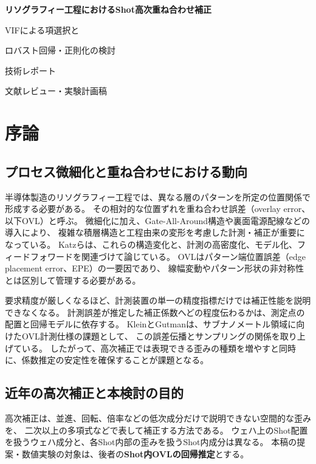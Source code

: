 \documentclass[11pt,a4paper]{ltjsarticle}
\newcommand{\ReportTitle}{リソグラフィー工程におけるShot高次重ね合わせ補正}
\begin{document}
\hypersetup{pageanchor=false}
\begin{titlepage}
  \centering
  \vspace*{35mm}
  {\LARGE\bfseries \ReportTitle\par}
  \vspace{12mm}
  {\Large VIFによる項選択と\par ロバスト回帰・正則化の検討\par}
  \vspace{35mm}
  {\large \AuthorName\par}
  \vfill
  {\large 技術レポート\par}
  \vspace{8mm}
  {\normalsize 文献レビュー・実験計画稿\par}
\end{titlepage}

\hypersetup{pageanchor=true}
\tableofcontents
\clearpage
{}

\section{序論}
\subsection{プロセス微細化と重ね合わせにおける動向}
半導体製造のリソグラフィー工程では、異なる層のパターンを所定の位置関係で形成する必要がある。
その相対的な位置ずれを重ね合わせ誤差（overlay error、以下OVL）と呼ぶ。
微細化に加え、Gate-All-Around構造や裏面電源配線などの導入により、
複雑な積層構造と工程由来の変形を考慮した計測・補正が重要になっている。
Katzらは、これらの構造変化と、計測の高密度化、モデル化、フィードフォワードを関連づけて論じている\cite{katz2026}。
OVLはパターン端位置誤差（edge placement error、EPE）の一要因であり、
線幅変動やパターン形状の非対称性とは区別して管理する必要がある。

要求精度が厳しくなるほど、計測装置の単一の精度指標だけでは補正性能を説明できなくなる。
計測誤差が推定した補正係数へどの程度伝わるかは、測定点の配置と回帰モデルに依存する。
KleinとGutmanは、サブナノメートル領域に向けたOVL計測仕様の課題として、
この誤差伝播とサンプリングの関係を取り上げている\cite{klein2026}。
したがって、高次補正では表現できる歪みの種類を増やすと同時に、係数推定の安定性を確保することが課題となる。

\subsection{近年の高次補正と本検討の目的}
高次補正は、並進、回転、倍率などの低次成分だけで説明できない空間的な歪みを、
二次以上の多項式などで表して補正する方法である。
ウェハ上のShot配置を扱うウェハ成分と、各Shot内部の歪みを扱うShot内成分は異なる。
本稿の提案・数値実験の対象は、後者の\textbf{Shot内OVLの回帰推定}とする。
\end{document}
